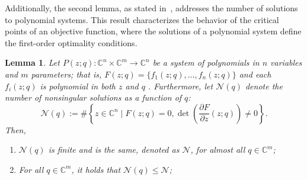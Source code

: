 \documentclass[sn-mathphys-num]{sn-jnl}%
\newtheorem{lemma}{Lemma}[section]
\theoremstyle{thmstyleone}%
\theoremstyle{thmstyletwo}%
\theoremstyle{thmstylethree}%
\begin{document}
%
Additionally, the second lemma, as stated in~\cite[Theorem 7.1.1]{Sommese05}, addresses the number of solutions to polynomial systems. This result characterizes the behavior of the critical points of an objective function, where the solutions of a polynomial system define the first-order optimality conditions.
\begin{lemma}\label{lemma:count}
 Let $P(z; q): \mathbb{C}^n \times \mathbb{C}^m \to \mathbb{C}^n$ be a system of polynomials in $n$ variables and $m$ parameters; that is,
 $F(z; q) = \{f_1(z; q), \ldots, f_n(z; q)\}$ and each $f_i(z; q)$ is polynomial in both $z$ and $q$ . 
Furthermore, let $\mathcal{N}(q)$ denote the number of nonsingular solutions as a function of $q$:
\[
 \mathcal{N}(q) := \# \left\{ z \in \mathbb{C}^n \mid F(z; q) = 0, \det \left( \frac{\partial F}{\partial z}(z; q) \right) \neq 0 \right\}.
 \]
Then, 
 \begin{enumerate}
\item $\mathcal{N}(q)$ is finite and is the same, denoted as $\mathcal{N}$, for almost all $q \in \mathbb{C}^m$;
\item For all $q \in \mathbb{C}^m$, it holds that $\mathcal{N}(q) \leq \mathcal{N}$;


 
 \end{enumerate} 
\end{lemma}







\end{document}
